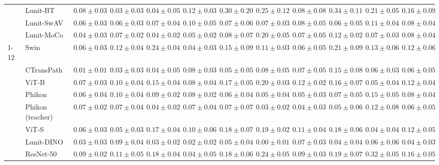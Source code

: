 \begin{tabular}{ll|cccc|c|cccc|c}
 & Lunit-BT & $0.08 \pm 0.03$ & $0.03 \pm 0.03$ & $0.04 \pm 0.05$ & $0.12 \pm 0.03$ & $0.30 \pm 0.20$ & $0.25 \pm 0.12$ & $0.08 \pm 0.08$ & $0.34 \pm 0.11$ & $0.21 \pm 0.05$ & $0.16 \pm 0.09$ \\
 & Lunit-SwAV & $0.06 \pm 0.03$ & $0.06 \pm 0.03$ & $0.07 \pm 0.04$ & $0.10 \pm 0.05$ & $0.07 \pm 0.06$ & $0.07 \pm 0.03$ & $0.08 \pm 0.05$ & $0.06 \pm 0.05$ & $0.11 \pm 0.04$ & $0.08 \pm 0.04$ \\
 & Lunit-MoCo & $0.04 \pm 0.03$ & $0.07 \pm 0.02$ & $0.04 \pm 0.02$ & $0.05 \pm 0.02$ & $0.08 \pm 0.07$ & $0.20 \pm 0.05$ & $0.07 \pm 0.05$ & $0.12 \pm 0.02$ & $0.07 \pm 0.03$ & $0.08 \pm 0.04$ \\
\cline{1-12}
\multirow[t]{12}{*}{Transformer} & Swin & $0.06 \pm 0.03$ & $0.12 \pm 0.04$ & $0.24 \pm 0.04$ & $0.04 \pm 0.03$ & $0.15 \pm 0.09$ & $0.11 \pm 0.03$ & $0.06 \pm 0.05$ & $0.21 \pm 0.09$ & $0.13 \pm 0.06$ & $0.12 \pm 0.06$ \\
 & CTransPath & $\mathbf{0.01 \pm 0.01}$ & $\mathbf{0.03 \pm 0.03}$ & $0.04 \pm 0.05$ & $0.08 \pm 0.03$ & $0.05 \pm 0.05$ & $0.08 \pm 0.05$ & $0.07 \pm 0.05$ & $0.15 \pm 0.08$ & $0.06 \pm 0.03$ & $0.06 \pm 0.05$ \\
 & ViT-B & $0.07 \pm 0.03$ & $0.10 \pm 0.04$ & $0.15 \pm 0.04$ & $0.08 \pm 0.04$ & $0.17 \pm 0.05$ & $0.20 \pm 0.03$ & $0.12 \pm 0.02$ & $0.16 \pm 0.07$ & $0.05 \pm 0.04$ & $0.12 \pm 0.04$ \\
 & Phikon & $0.06 \pm 0.04$ & $0.10 \pm 0.04$ & $0.09 \pm 0.02$ & $0.08 \pm 0.02$ & $0.06 \pm 0.04$ & $0.05 \pm 0.04$ & $0.05 \pm 0.03$ & $0.07 \pm 0.05$ & $0.15 \pm 0.05$ & $0.08 \pm 0.04$ \\
 & Phikon (teacher) & $0.07 \pm 0.02$ & $0.07 \pm 0.04$ & $0.04 \pm 0.02$ & $0.07 \pm 0.04$ & $0.07 \pm 0.07$ & $0.03 \pm 0.02$ & $0.04 \pm 0.03$ & $0.05 \pm 0.06$ & $0.12 \pm 0.08$ & $0.06 \pm 0.05$ \\
 & ViT-S & $0.06 \pm 0.03$ & $0.05 \pm 0.03$ & $0.17 \pm 0.04$ & $0.10 \pm 0.06$ & $0.18 \pm 0.07$ & $0.19 \pm 0.02$ & $0.11 \pm 0.04$ & $0.18 \pm 0.06$ & $\mathbf{0.04 \pm 0.04}$ & $0.12 \pm 0.05$ \\
 & Lunit-DINO & $0.03 \pm 0.03$ & $0.09 \pm 0.04$ & $0.03 \pm 0.02$ & $\mathbf{0.02 \pm 0.02}$ & $\mathbf{0.05 \pm 0.04}$ & $\mathbf{0.00 \pm 0.01}$ & $0.07 \pm 0.03$ & $\mathbf{0.04 \pm 0.04}$ & $0.06 \pm 0.06$ & $\mathbf{0.04 \pm 0.03}$ \\
 & ResNet-50 & $0.09 \pm 0.02$ & $0.11 \pm 0.05$ & $0.18 \pm 0.04$ & $0.04 \pm 0.05$ & $0.18 \pm 0.06$ & $0.24 \pm 0.05$ & $0.09 \pm 0.03$ & $0.19 \pm 0.07$ & $0.32 \pm 0.05$ & $0.16 \pm 0.05$ \\

\end{tabular}
